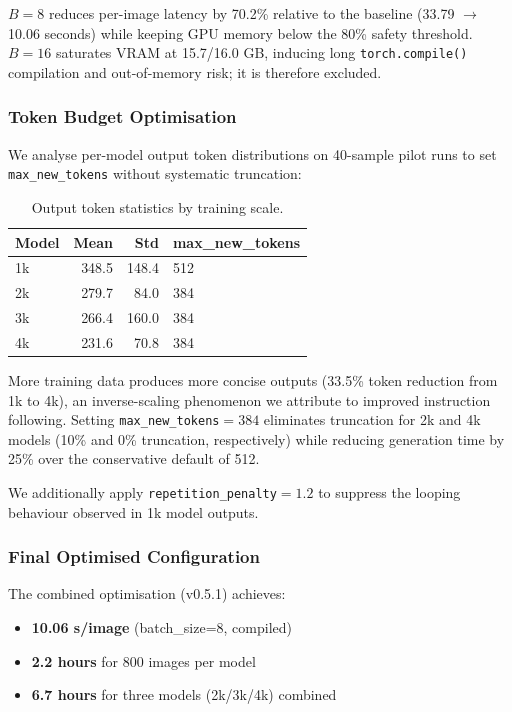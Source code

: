 \documentclass[twocolumn]{article}
\begin{document}
$B = 8$ reduces per-image latency by 70.2\% relative to the baseline (33.79 $\to$
10.06 seconds) while keeping GPU memory below the 80\% safety threshold.
$B = 16$ saturates VRAM at 15.7/16.0 GB, inducing long \texttt{torch.compile()}
compilation and out-of-memory risk; it is therefore excluded.

\subsubsection{Token Budget Optimisation}

We analyse per-model output token distributions on 40-sample pilot runs to set
\texttt{max\_new\_tokens} without systematic truncation:

\begin{table}[h]
\centering
\caption{Output token statistics by training scale.}
\label{tab:tokens}
\begin{tabular}{lrrl}
\toprule
\textbf{Model} & \textbf{Mean} & \textbf{Std} & \textbf{max\_new\_tokens} \\
\midrule
1k & 348.5 & 148.4 & 512 \\
2k & 279.7 &  84.0 & 384 \\
3k & 266.4 & 160.0 & 384 \\
4k & 231.6 &  70.8 & 384 \\
\bottomrule
\end{tabular}
\end{table}

More training data produces more concise outputs (33.5\% token reduction from
1k to 4k), an inverse-scaling phenomenon we attribute to improved instruction
following. Setting \texttt{max\_new\_tokens}$=384$ eliminates truncation for 2k
and 4k models (10\% and 0\% truncation, respectively) while reducing generation
time by 25\% over the conservative default of 512.

We additionally apply \texttt{repetition\_penalty}$=1.2$ to suppress
the looping behaviour observed in 1k model outputs.

\subsubsection{Final Optimised Configuration}

The combined optimisation (v0.5.1) achieves:
\begin{itemize}[leftmargin=*,itemsep=1pt]
  \item \textbf{10.06 s/image} (batch\_size=8, compiled)
  \item \textbf{2.2 hours} for 800 images per model
  \item \textbf{6.7 hours} for three models (2k/3k/4k) combined
\end{itemize}
\end{document}
